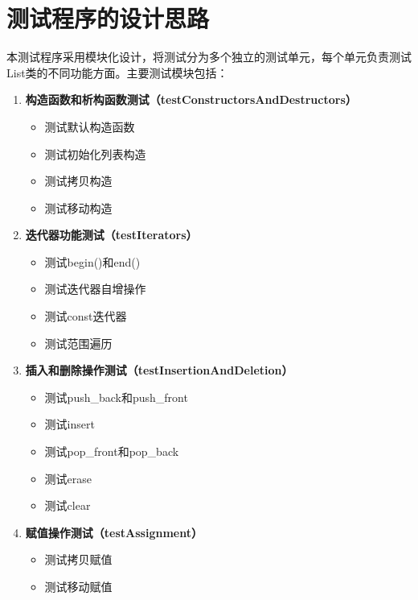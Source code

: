 \documentclass[UTF8]{ctexart}
\begin{document}
\pagestyle{fancy}
\fancyhead{}

\section{测试程序的设计思路}

本测试程序采用模块化设计，将测试分为多个独立的测试单元，每个单元负责测试List类的不同功能方面。主要测试模块包括：

\begin{enumerate}
    \item \textbf{构造函数和析构函数测试（testConstructorsAndDestructors）}
    \begin{itemize}
        \item 测试默认构造函数
        \item 测试初始化列表构造
        \item 测试拷贝构造
        \item 测试移动构造
    \end{itemize}
    
    \item \textbf{迭代器功能测试（testIterators）}
    \begin{itemize}
        \item 测试begin()和end()
        \item 测试迭代器自增操作
        \item 测试const迭代器
        \item 测试范围遍历
    \end{itemize}
    
    \item \textbf{插入和删除操作测试（testInsertionAndDeletion）}
    \begin{itemize}
        \item 测试push\_back和push\_front
        \item 测试insert
        \item 测试pop\_front和pop\_back
        \item 测试erase
        \item 测试clear
    \end{itemize}
    
    \item \textbf{赋值操作测试（testAssignment）}
    \begin{itemize}
        \item 测试拷贝赋值
        \item 测试移动赋值
    \end{itemize}
\end{enumerate}
\end{document}

